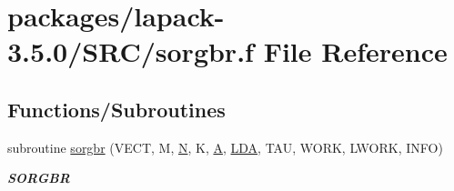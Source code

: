 \hypertarget{sorgbr_8f}{}\section{packages/lapack-\/3.5.0/\+S\+R\+C/sorgbr.f File Reference}
\label{sorgbr_8f}
\subsection*{Functions/\+Subroutines}
\begin{DoxyCompactItemize}
\item 
subroutine \hyperlink{group__realGBcomputational_ga2afc11d15eaf27524838268032c62b94}{sorgbr} (V\+E\+C\+T, M, \hyperlink{polmisc_8c_a0240ac851181b84ac374872dc5434ee4}{N}, K, \hyperlink{classA}{A}, \hyperlink{example__user_8c_ae946da542ce0db94dced19b2ecefd1aa}{L\+D\+A}, T\+A\+U, W\+O\+R\+K, L\+W\+O\+R\+K, I\+N\+F\+O)
\begin{DoxyCompactList}\small\item\em {\bfseries S\+O\+R\+G\+B\+R} \end{DoxyCompactList}\end{DoxyCompactItemize}
